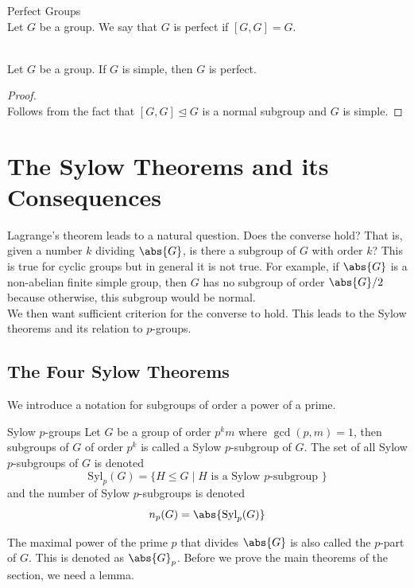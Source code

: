 \documentclass[a4paper]{article}
\begin{document}
\begin{defn}{Perfect Groups}{}\\
Let $G$ be a group. We say that $G$ is perfect if $[G,G]=G$. 
\end{defn}

\begin{lmm}{}{}\\
Let $G$ be a group. If $G$ is simple, then $G$ is perfect. 
\begin{proof}\\
Follows from the fact that $[G,G]\trianglelefteq G$ is a normal subgroup and $G$ is simple. 
\end{proof}
\end{lmm}

\pagebreak
\section{The Sylow Theorems and its Consequences}
Lagrange's theorem leads to a natural question. Does the converse hold? That is, given a number $k$ dividing $\abs{G}$, is there a subgroup of $G$ with order $k$? This is true for cyclic groups but in general it is not true. For example, if $\abs{G}$ is a non-abelian finite simple group, then $G$ has no subgroup of order $\abs{G}/2$ because otherwise, this subgroup would be normal. \\

We then want sufficient criterion for the converse to hold. This leads to the Sylow theorems and its relation to $p$-groups. 
\subsection{The Four Sylow Theorems}
We introduce a notation for subgroups of order a power of a prime. 

\begin{defn}{Sylow $p$-groups}{} Let $G$ be a group of order $p^km$ where $\gcd(p,m)=1$, then subgroups of $G$ of order $p^k$ is called a Sylow $p$-subgroup of $G$. The set of all Sylow $p$-subgroups of $G$ is denoted $$\text{Syl}_p(G)=\{H\leq G\;|\;H\text{ is a Sylow }p\text{-subgroup }\}$$ and the number of Sylow $p$-subgroups is denoted $$n_p(G)=\abs{\text{Syl}_p(G)}$$ 
\end{defn}

The maximal power of the prime $p$ that divides $\abs{G}$ is also called the $p$-part of $G$. This is denoted as $\abs{G}_p$. Before we prove the main theorems of the section, we need a lemma. 
\end{document}
